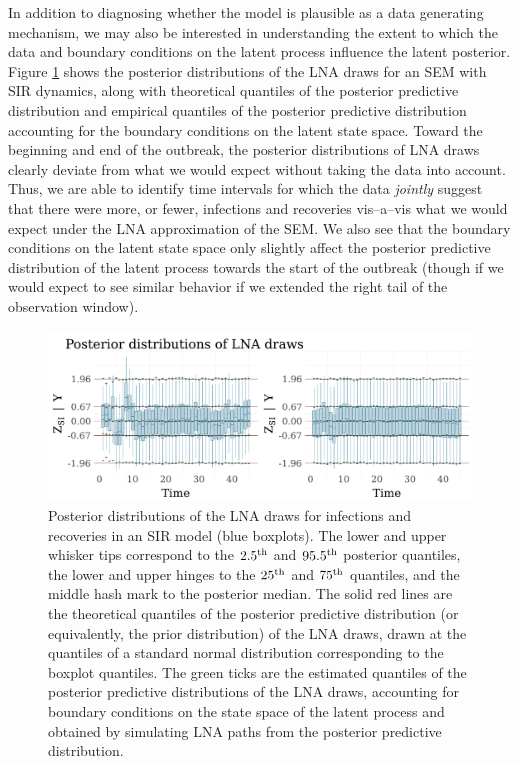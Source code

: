In addition to diagnosing whether the model is plausible as a data generating mechanism, we may also be interested in understanding the extent to which the data and boundary conditions on the latent process influence the latent posterior. Figure \ref{fig:sir_drawplots} shows the posterior distributions of the LNA draws for an SEM with SIR dynamics, along with theoretical quantiles of the posterior predictive distribution and empirical quantiles of the posterior predictive distribution accounting for the boundary conditions on the latent state space. 
Toward the beginning and end of the outbreak, the posterior distributions of LNA draws clearly deviate from what we would expect without taking the data into account. Thus, we are able to identify time intervals for which the data \textit{jointly} suggest that there were more, or fewer, infections and recoveries vis--a--vis what we would expect under the LNA approximation of the SEM. We also see that the boundary conditions on the latent state space only slightly affect the posterior predictive distribution of the latent process towards the start of the outbreak (though if we would expect to see similar behavior if we extended the right tail of the observation window). 

\begin{figure}[htbp]
	\centering
	\includegraphics[width=\linewidth]{figures/sir_drawplots}
	\caption[Posterior distributions of LNA draws for an SIR model.]{Posterior distributions of the LNA draws for infections and recoveries in an SIR model (blue boxplots). The lower and upper whisker tips correspond to the $ 2.5^{\mathrm{th}} $ and $ 95.5^{\mathrm{th}} $ posterior quantiles, the lower and upper hinges to the $ 25^{\mathrm{th}} $ and $ 75^{\mathrm{th}} $ quantiles, and the middle hash mark to the posterior median. The solid red lines are the theoretical quantiles of the posterior predictive distribution (or equivalently, the prior distribution) of the LNA draws, drawn at the quantiles of a standard normal distribution corresponding to the boxplot quantiles. The green ticks are the estimated quantiles of the posterior predictive distributions of the LNA draws, accounting for boundary conditions on the state space of the latent process and obtained by simulating LNA paths from the posterior predictive distribution.}
	\label{fig:sir_drawplots}
\end{figure}

